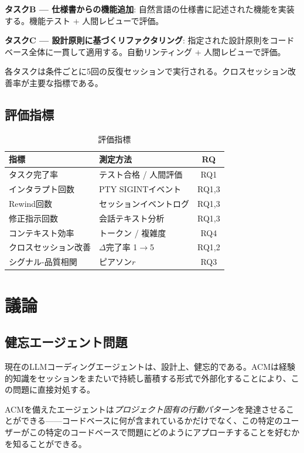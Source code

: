 \documentclass[conference]{IEEEtran}
\begin{document}
\textbf{タスクB --- 仕様書からの機能追加}: 自然言語の仕様書に記述された機能を実装する。機能テスト + 人間レビューで評価。

\textbf{タスクC --- 設計原則に基づくリファクタリング}: 指定された設計原則をコードベース全体に一貫して適用する。自動リンティング + 人間レビューで評価。

各タスクは条件ごとに5回の反復セッションで実行される。クロスセッション改善率が主要な指標である。

\subsection{評価指標}

\begin{table}[h]
\centering
\caption{評価指標}
\label{tab:metrics}
\small
\begin{tabular}{p{2.5cm}p{2.5cm}c}
\toprule
\textbf{指標} & \textbf{測定方法} & \textbf{RQ} \\
\midrule
タスク完了率 & テスト合格 / 人間評価 & RQ1 \\
インタラプト回数 & PTY SIGINTイベント & RQ1,3 \\
Rewind回数 & セッションイベントログ & RQ1,3 \\
修正指示回数 & 会話テキスト分析 & RQ1,3 \\
コンテキスト効率 & トークン / 複雑度 & RQ4 \\
クロスセッション改善 & $\Delta$完了率 1$\rightarrow$5 & RQ1,2 \\
シグナル-品質相関 & ピアソン$r$ & RQ3 \\
\bottomrule
\end{tabular}
\end{table}

\section{議論}

\subsection{健忘エージェント問題}

現在のLLMコーディングエージェントは、設計上、健忘的である。ACMは経験的知識をセッションをまたいで持続し蓄積する形式で外部化することにより、この問題に直接対処する。

ACMを備えたエージェントは\emph{プロジェクト固有の行動パターン}を発達させることができる——コードベースに何が含まれているかだけでなく、この特定のユーザーがこの特定のコードベースで問題にどのようにアプローチすることを好むかを知ることができる。
\end{document}

